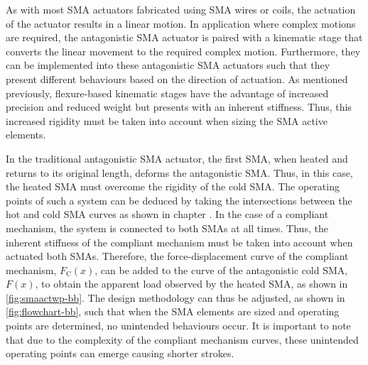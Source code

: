 As with most SMA actuators fabricated using SMA wires or coils, the actuation of the actuator results in a linear motion. In application where complex motions are required, the antagonistic SMA actuator is paired with a kinematic stage that converts the linear movement to the required complex motion. Furthermore, they can be implemented into these antagonistic SMA actuators such that they present different behaviours based on the direction of actuation. As mentioned previously, flexure-based kinematic stages have the advantage of increased precision and reduced weight but presents with an inherent stiffness. Thus, this increased rigidity must be taken into account when sizing the SMA active elements.

In the traditional antagonistic SMA actuator, the first SMA, when heated and returns to its original length, deforms the antagonistic SMA. Thus, in this case, the heated SMA must overcome the rigidity of the cold SMA. The operating points of such a system can be deduced by taking the intersections between the hot and cold SMA curves as shown in chapter \todocite. In the case of a compliant mechanism, the system is connected to both SMAs at all times. Thus, the inherent stiffness of the compliant mechanism must be taken into account when actuated both SMAs. Therefore, the force-displacement curve of the compliant mechanism, $F_\mathrm{C}(x)$, can be added to the curve of the antagonistic cold SMA, $F(x)$, to obtain the apparent load observed by the heated SMA, as shown in \cref{fig:smaactwp-bb}. The design methodology can thus be adjusted, as shown in \cref{fig:flowchart-bb}, such that when the SMA elements are sized and operating points are determined, no unintended behaviours occur. It is important to note that due to the complexity of the compliant mechanism curves, these unintended operating points can emerge causing shorter strokes.

